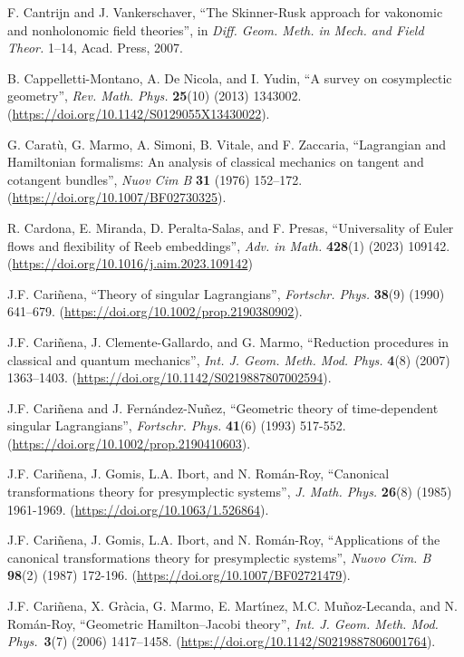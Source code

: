 \documentclass[12pt]{report}
\begin{document}
\begin{thebibliography}{999}
F. Cantrijn and J. Vankerschaver,
``The Skinner-Rusk approach for vakonomic and nonholonomic field theories'',
in {\sl Diff. Geom. Meth. in Mech. and Field Theor.} 1--14, 
Acad. Press, 2007.

B. Cappelletti-Montano, A. De Nicola, and I. Yudin,
``A survey on cosymplectic geometry'',
{\sl Rev. Math. Phys.} {\bf 25}(10) (2013) 1343002.
(\url{https://doi.org/10.1142/S0129055X13430022}).

G. Carat\`u, G. Marmo, A. Simoni, B. Vitale, and F. Zaccaria,
``Lagrangian and Hamiltonian formalisms: An analysis of classical mechanics on tangent and cotangent bundles'',
{\sl Nuov Cim B} {\bf 31} (1976) 152--172. (\url{https://doi.org/10.1007/BF02730325}).

R. Cardona, E. Miranda, D. Peralta-Salas, and F. Presas,
``Universality of Euler flows and flexibility of Reeb embeddings'',
{\sl Adv. in Math.} {\bf 428}(1) (2023) 109142.
(\url{https://doi.org/10.1016/j.aim.2023.109142})

J.F. Cari\~nena,
``Theory of singular Lagrangians'',
{\sl  Fortschr. Phys.} {\bf 38}(9) (1990) 641--679.
(\url{https://doi.org/10.1002/prop.2190380902}).

J.F. Cari\~nena, J. Clemente-Gallardo, and G. Marmo,
``Reduction procedures in classical and quantum mechanics'',
{\sl Int. J. Geom. Meth. Mod. Phys.} {\bf 4}(8)  (2007) 1363--1403.
(\url{https://doi.org/10.1142/S0219887807002594}).

J.F. Cari\~nena and J. Fern\'andez-Nu\~nez,
``Geometric theory of time-dependent singular Lagrangians'',
{\sl Fortschr. Phys.} {\bf 41}(6) (1993) 517-552.
(\url{https://doi.org/10.1002/prop.2190410603}).

J.F. Cari\~nena, J. Gomis, L.A. Ibort, and N. Rom\'an-Roy,
``Canonical transformations theory for presymplectic systems'',
{\sl J. Math. Phys.} {\bf 26}(8) (1985) 1961-1969.
(\url{https://doi.org/10.1063/1.526864}).

J.F. Cari\~nena, J. Gomis, L.A. Ibort, and N. Rom\'an-Roy,
``Applications of the canonical transformations theory for presymplectic systems'',
{\sl Nuovo Cim. B} {\bf 98}(2) (1987) 172-196.
(\url{https://doi.org/10.1007/BF02721479}).

J.F. Cari\~nena, X. Gr\`acia, G. Marmo, E. Mart\'{\i}nez, M.C. Mu\~noz-Lecanda, 
and N. Rom\'an-Roy,
``Geometric Hamilton--Jacobi theory'',
{\sl Int. J. Geom. Meth. Mod. Phys.}~{\bf 3}(7) (2006) 1417--1458.
(\url{https://doi.org/10.1142/S0219887806001764}).


\end{thebibliography}
\end{document}
